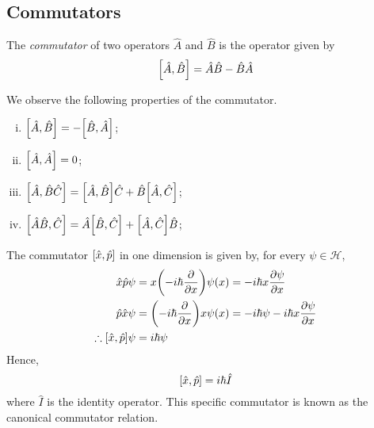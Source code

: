 \subsection{Commutators}
\begin{definition}
	The \textit{commutator} of two operators \( \hat A \) and \( \hat B \) is the operator given by
	\[
		\qty[\hat A, \hat B] = \hat A \hat B - \hat B \hat A
	\]
\end{definition}
We observe the following properties of the commutator.
\begin{enumerate}[(i)]
	\item \( \qty[\hat A, \hat B] = -\qty[\hat B, \hat A] \);
	\item \( \qty[\hat A, \hat A] = 0 \);
	\item \( \qty[\hat A, \hat B \hat C] = \qty[\hat A, \hat B] \hat C + \hat B \qty[\hat A, \hat C] \);
	\item \( \qty[\hat A \hat B, \hat C] = \hat A \qty[\hat B, \hat C] + \qty[\hat A, \hat C] \hat B \);
\end{enumerate}
\begin{example}
	The commutator \( \qty[\hat x, \hat p] \) in one dimension is given by, for every \( \psi \in \mathcal H \),
	\begin{align*}
		\hat x \hat p \psi                   & = x \qty(-i\hbar \pdv{x}) \psi(x) = -i\hbar x \pdv{\psi}{x}                 \\
		\hat p \hat x \psi                   & = \qty(-i\hbar \pdv{x}) x \psi(x) = -i \hbar \psi - i \hbar x \pdv{\psi}{x} \\
		\therefore \qty[\hat x, \hat p] \psi & = i \hbar \psi
	\end{align*}
	Hence,
	\[
		\qty[\hat x, \hat p] = i \hbar \hat I
	\]
	where \( \hat I \) is the identity operator.
	This specific commutator is known as the canonical commutator relation.
\end{example}

